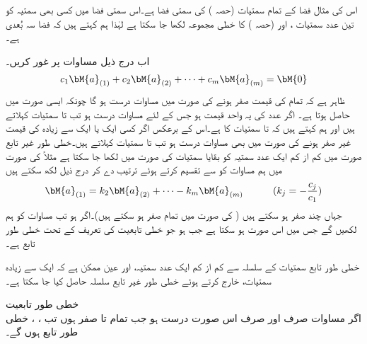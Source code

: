 اس کی مثال فضا کے تمام سمتیات (حصہ ) کی سمتی فضا ہے۔اس سمتی فضا میں کسی بھی سمتیہ کو تین عدد سمتیات  ،  اور   (حصہ ) کا خطی مجموعہ لکھا جا سکتا ہے لہٰذا ہم کہتے ہیں کہ فضا سہ بُعدی  ہے۔

اب درج ذیل مساوات پر غور کریں۔
\begin{align}\label{مساوات_الجبرا_غیر_تابعیت_الف}
c_1\bM{a}_{(1)}+c_2\bM{a}_{(2)}+\cdots+c_m\bM{a}_{(m)}=\bM{0}
\end{align}
ظاہر ہے کہ تمام  کی قیمت صفر ہونے کی صورت میں مساوات  درست ہو گا چونکہ ایسی صورت میں  حاصل ہوتا ہے۔ اگر  عدد  کی یہ واحد قیمت ہو جس کے لئے مساوات  درست ہو تب  تا  سمتیات  کہلاتے ہیں اور ہم کہتے ہیں کہ   تا  سمتیات کا  ہے۔اس کے برعکس اگر کسی ایک یا ایک سے زیادہ  کی قیمت غیر صفر ہونے کی صورت میں بھی مساوات  درست ہو تب  تا  سمتیات  کہلاتے ہیں۔خطی طور غیر تابع صورت میں کم از کم ایک عدد سمتیہ کو بقایا سمتیات کی صورت میں لکھا جا سکتا ہے مثلاً  کی صورت میں ہم مساوات  کو  سے تقسیم کرتے ہوئے ترتیب دے کر درج ذیل لکھ سکتے ہیں
\begin{align*}
\bM{a}_{(1)}=k_2\bM{a}_{(2)}+\cdots-k_m\bM{a}_{(m)}   \quad \quad\quad (k_j=-\frac{c_j}{c_1})
\end{align*}
جہاں چند  صفر ہو سکتے ہیں ( کی صورت میں تمام  صفر ہو سکتے ہیں)۔اگر  ہو تب  مساوات  کو ہم  لکھیں گے جس میں  اس صورت ہو سکتا ہے جب  ہو جو خطی تابعیت کی تعریف کے تحت خطی طور تابع ہے۔

خطی طور تابع سمتیات کے سلسلہ سے کم از کم ایک عدد سمتیہ، اور عین ممکن ہے کہ ایک سے زیادہ سمتیات، خارج کرتے ہوئے خطی طور غیر تابع سلسلہ حاصل کیا جا سکتا ہے۔

\quad خطی طور تابعیت\\
اگر مساوات  صرف اور صرف  اس صورت درست ہو جب تمام  تا  صفر ہوں تب ، ،  خطی طور تابع ہوں گے۔

